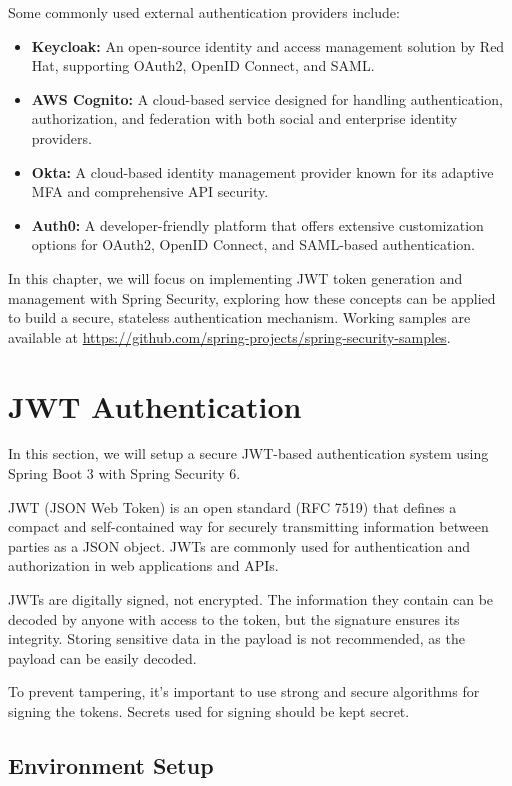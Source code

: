 Some commonly used external authentication providers include:
\begin{itemize}
    \item \textbf{Keycloak:} An open-source identity and access management solution by Red Hat, supporting OAuth2, OpenID Connect, and SAML.
    \item \textbf{AWS Cognito:} A cloud-based service designed for handling authentication, authorization, and federation with both social and enterprise identity providers.
    \item \textbf{Okta:} A cloud-based identity management provider known for its adaptive MFA and comprehensive API security.
    \item \textbf{Auth0:} A developer-friendly platform that offers extensive customization options for OAuth2, OpenID Connect, and SAML-based authentication.
\end{itemize}

In this chapter, we will focus on implementing JWT token generation and management with Spring Security, exploring how these concepts can be applied to build a secure, stateless authentication mechanism.  Working samples are available at \url{https://github.com/spring-projects/spring-security-samples}.

\section{JWT Authentication}

In this section, we will setup a secure JWT-based authentication system using Spring Boot 3 with Spring Security 6.

JWT (JSON Web Token) is an open standard (RFC 7519) that defines a compact and self-contained way for securely transmitting information between parties as a JSON object. JWTs are commonly used for authentication and authorization in web applications and APIs.

JWTs are digitally signed, not encrypted. The information they contain can be decoded by anyone with access to the token, but the signature ensures its integrity. Storing sensitive data in the payload is not recommended, as the payload can be easily decoded.

To prevent tampering, it’s important to use strong and secure algorithms for signing the tokens.  Secrets used for signing should be kept secret. 

\subsection*{Environment Setup}

